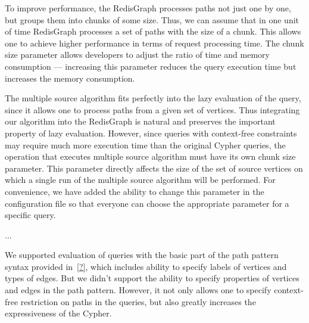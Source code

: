 To improve performance, the RedisGraph processes paths not just one by one, but groups them into chunks of some size. Thus, we can assume that in one unit of time RedisGraph processes a set of paths with the size of a chunk. This allows one to achieve higher performance in terms of request processing time. The chunk size parameter allows developers to adjust the ratio of time and memory consumption --- increasing this parameter reduces the query execution time but increases the memory consumption.

The multiple source algorithm fits perfectly into the lazy evaluation of the query, since it allows one to process paths from a given set of vertices. Thus integrating our algorithm into the RedisGraph is natural and preserves the important property of lazy evaluation. However, since queries with context-free constraints may require much more execution time than the original Cypher queries, the operation that executes multiple source algorithm must have its own chunk size parameter. This parameter directly affects the size of the set of source vertices on which a single run of the multiple source algorithm will be performed. For convenience, we have added the ability to change this parameter in the configuration file so that everyone can choose the appropriate parameter for a specific query.

...

We supported evaluation of queries with the basic part of the path pattern syntax provided in~\autoref{?}, which includes ability to specify labels of vertices and types of edges. But we didn't support the ability to specify properties of vertices and edges in the path pattern. However, it not only allows one to specify context-free restriction on paths in the queries, but also greatly increases the expressiveness of the Cypher. 


